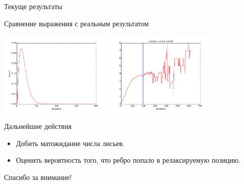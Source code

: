 \documentclass{beamer}
\begin{document}
\begin{frame}{Текуще результаты}
\begin{block}{Сравнение выражения с реальным результатом}
\begin{center}
\includegraphics*[height=4cm]{pic/firstPart.png}
\includegraphics*[height=4cm]{pic/leaves_v15e15.png}
\end{center}
\end{block}
\end{frame}

\begin{frame}{Дальнейшие действия}
\begin{block}{}
\begin{itemize}
\item Добить матожидание числа лисьев.
\item Оценить вероятность того, что ребро попало в релаксируемую позицию.
\end{itemize}
\end{block}
\end{frame}

\begin{frame}{}
\begin{center}
Спасибо за внимание!
\end{center}
\end{frame}
\end{document}

